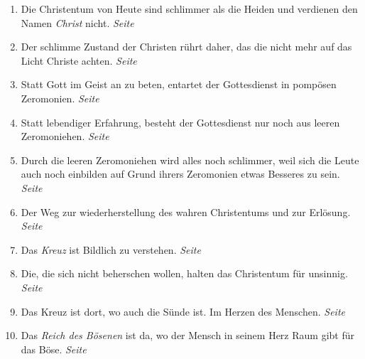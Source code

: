 \begin{enumerate}
 \item Die Christentum von Heute sind schlimmer als die Heiden und verdienen den
Namen \textit{Christ} nicht.
 \dotfill \textit{Seite
\pageref{ref:02_08_schlimmer_als_heiden}}\\

 \item Der schlimme Zustand der Christen rührt daher, das die nicht mehr auf das
Licht Christe achten.
 \dotfill \textit{Seite
\pageref{ref:02_08_ursache_des_abfalls}}\\
 \item Statt Gott im Geist an zu beten, entartet der Gottesdienst in pompösen
Zeromonien.
 \dotfill \textit{Seite \pageref{ref:02_08_falscher_gottesdienst}}\\

 \item Statt lebendiger Erfahrung, besteht der Gottesdienst nur noch aus leeren
Zeromoniehen. \dotfill \textit{Seite \pageref{ref:02_09_lebendige_erfahrung}}\\

 \item Durch die leeren Zeromoniehen wird alles noch schlimmer, weil sich die
Leute auch noch einbilden auf Grund ihrers Zeromonien etwas Besseres zu sein.
 \dotfill \textit{Seite
\pageref{ref:02_09_selbstueberschaetzung}}\\

 \item Der Weg zur wiederherstellung des wahren Christentums und zur Erlösung.
 \dotfill \textit{Seite \pageref{ref:02_10_abhilfe}}\\
 
 \item Das \textit{Kreuz} ist Bildlich zu verstehen.
 \dotfill \textit{Seite \pageref{ref:03_01_das_kreuz}}\\
 
 \item Die, die sich nicht beherschen wollen, halten das Christentum für
unsinnig.
 \dotfill \textit{Seite \pageref{ref:03_02_leidenschaft}}\\
 
 \item Das Kreuz ist dort, wo auch die Sünde ist. Im Herzen des Menschen.
 \dotfill \textit{Seite \pageref{ref:03_03_ort_des_kreuzes}}\\
 
 \item Das \textit{Reich des Bösenen} ist da, wo der Mensch in seinem Herz Raum
gibt für das Böse.
 \dotfill \textit{Seite \pageref{ref:03_04_reich_des_boesen}}\\
 

\end{enumerate}
